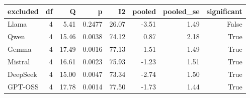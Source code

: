 \begin{tabular}{lrrrrrrr}
\toprule
excluded & df & Q & p & I2 & pooled & pooled\_se & significant \\
\midrule
Llama & 4 & 5.41 & 0.2477 & 26.07 & -3.51 & 1.49 & False \\
Qwen & 4 & 15.46 & 0.0038 & 74.12 & 0.87 & 2.18 & True \\
Gemma & 4 & 17.49 & 0.0016 & 77.13 & -1.51 & 1.49 & True \\
Mistral & 4 & 16.61 & 0.0023 & 75.93 & -1.23 & 1.51 & True \\
DeepSeek & 4 & 15.00 & 0.0047 & 73.34 & -2.74 & 1.50 & True \\
GPT-OSS & 4 & 17.78 & 0.0014 & 77.50 & -1.73 & 1.44 & True \\
\bottomrule
\end{tabular}
